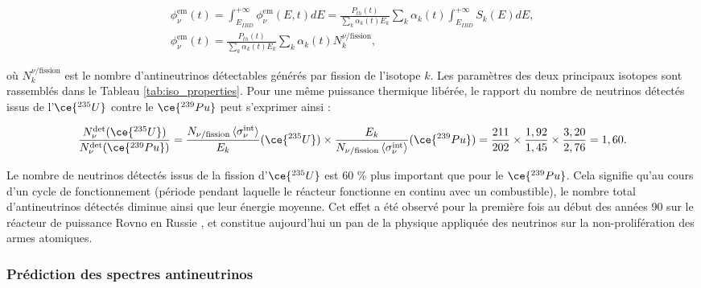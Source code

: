 \begin{equation}
\begin{gathered}
    \phi^\textrm{em}_\nu(t) = \int_{E_{IBD}}^{+\infty} \phi^\textrm{em}_\nu(E, t) dE = \frac{P_{th}(t)}{\sum_k \alpha_k (t) E_k} \sum_k \alpha_k (t) \int_{E_{IBD}}^{+\infty} S_k(E) dE,\\
    \phi^\textrm{em}_\nu(t) = \frac{P_{th}(t)}{\sum_k \alpha_k (t) E_k} \sum_k \alpha_k (t) N_k^{\nu/\textrm{fission}},
\end{gathered}
\end{equation}

\bigbreak

où $N_k^{\nu/\textrm{fission}}$ est le nombre d'antineutrinos détectables générés par fission de l'isotope $k$. Les paramètres des deux principaux isotopes sont rassemblés dans le Tableau \ref{tab:iso_properties}. Pour une même puissance thermique libérée, le rapport du nombre de neutrinos détectés issus de l'$\ce{^{235}U}$ contre le $\ce{^{239}Pu}$ peut s'exprimer ainsi :

\begin{equation}
    \frac{N_\nu^\textrm{det} (\ce{^{235}U})}{N_\nu^\textrm{det} (\ce{^{239}Pu})} = \frac{N_{\nu/\textrm{fission}} \left<\sigma_\nu^\textrm{int}\right>}{E_k} (\ce{^{235}U}) \times \frac{E_k}{N_{\nu/\textrm{fission}} \left<\sigma_\nu^\textrm{int}\right>} (\ce{^{239}Pu}) = \frac{211}{202} \times \frac{1,92}{1,45} \times \frac{3,20}{2,76} = 1,60.
\end{equation}

\bigbreak

Le nombre de neutrinos détectés issus de la fission d'$\ce{^{235}U}$ est 60 \% plus important que pour le $\ce{^{239}Pu}$. Cela signifie qu'au cours d'un cycle de fonctionnement (période pendant laquelle le réacteur fonctionne en continu avec un combustible), le nombre total d'antineutrinos détectés diminue ainsi que leur énergie moyenne. Cet effet a été observé pour la première fois au début des années 90 sur le réacteur de puissance Rovno en Russie \cite{Kuvshinnikov:1990ry}, et constitue aujourd'hui un pan de la physique appliquée des neutrinos sur la non-prolifération des armes atomiques.\\

\subsubsection*{Prédiction des spectres antineutrinos}

